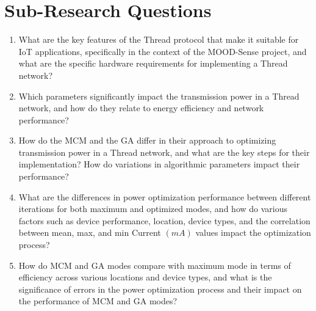 \section{Sub-Research Questions}
\begin{enumerate}
    \item What are the key features of the Thread protocol that make it suitable for \gls{IoT} applications, specifically in the context of the MOOD-Sense project, and what are the specific hardware requirements for implementing a Thread network?
    \item Which parameters significantly impact the transmission power in a Thread network, and how do they relate to energy efficiency and network performance?
    \item How do the \gls{MCM} and the \gls{GA} differ in their approach to optimizing transmission power in a Thread network, and what are the key steps for their implementation? How do variations in algorithmic parameters impact their performance?
    \item What are the differences in power optimization performance between different iterations for both maximum and optimized modes, and how do various factors such as device performance, location, device types, and the correlation between mean, max, and min Current $\left(mA\right)$ values impact the optimization process?
    \item How do \gls{MCM} and \gls{GA} modes compare with maximum mode in terms of efficiency across various locations and device types, and what is the significance of errors in the power optimization process and their impact on the performance of \gls{MCM} and \gls{GA} modes?
\end{enumerate}
